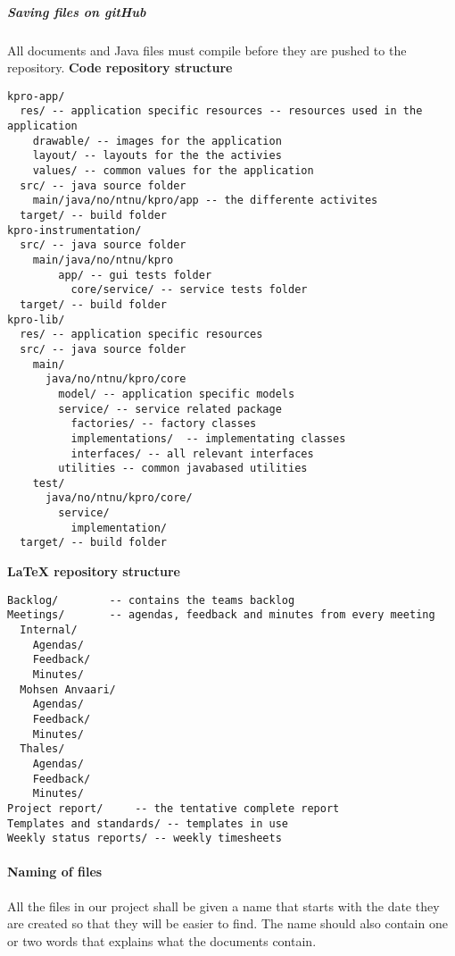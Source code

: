 \subparagraph{Saving files on gitHub}\hfill
\newline
All documents and Java files must compile before they are pushed to the repository.
\newline
\newline
\textbf{Code repository structure}
\begin{verbatim}
kpro-app/
  res/ -- application specific resources -- resources used in the application
    drawable/ -- images for the application
    layout/ -- layouts for the the activies
    values/ -- common values for the application
  src/ -- java source folder
    main/java/no/ntnu/kpro/app -- the differente activites
  target/ -- build folder
kpro-instrumentation/
  src/ -- java source folder
    main/java/no/ntnu/kpro
	    app/ -- gui tests folder
		  core/service/ -- service tests folder
  target/ -- build folder
kpro-lib/
  res/ -- application specific resources
  src/ -- java source folder
    main/
      java/no/ntnu/kpro/core
        model/ -- application specific models
        service/ -- service related package
          factories/ -- factory classes
          implementations/  -- implementating classes
          interfaces/ -- all relevant interfaces
        utilities -- common javabased utilities
    test/
      java/no/ntnu/kpro/core/
        service/
          implementation/
  target/ -- build folder
\end{verbatim}

\newpage

\textbf{LaTeX repository structure}
\begin{verbatim}
Backlog/		-- contains the teams backlog
Meetings/		-- agendas, feedback and minutes from every meeting
  Internal/
    Agendas/
    Feedback/
    Minutes/
  Mohsen Anvaari/
    Agendas/
    Feedback/
    Minutes/
  Thales/
    Agendas/
    Feedback/
    Minutes/
Project report/		-- the tentative complete report
Templates and standards/ -- templates in use
Weekly status reports/ -- weekly timesheets

\end{verbatim}

\paragraph{Naming of files}\hfill
\newline
All the files in our project shall be given a name that starts with the date they are created so that they will be easier to find. The name should also contain one or two words that explains what the documents contain.


